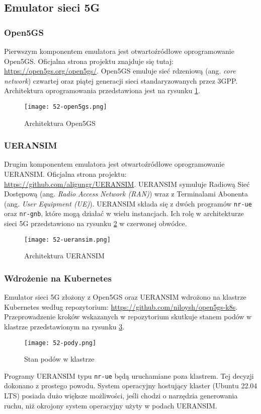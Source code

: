 \subsection{Emulator sieci 5G}

\subsubsection{Open5GS}

Pierwszym komponentem emulatora jest otwartoźródłowe oprogramowanie Open5GS. Oficjalna strona projektu znajduje się tutaj: \url{https://open5gs.org/open5gs/}. Open5GS emuluje sieć rdzeniową (ang. \textit{core network}) czwartej oraz piątej generacji sieci standaryzowanych przez 3GPP. Architektura oprogramowania przedstawiona jest na rysunku \ref{fig:52-open5gs}.

\begin{figure}[!h]
    \centering \texttt{[image: 52-open5gs.png]}
    \caption{Architektura Open5GS}\label{fig:52-open5gs}
\end{figure}

\subsubsection{UERANSIM}

Drugim komponentem emulatora jest otwartoźródłowe oprogramowanie UERANSIM. Oficjalna strona projektu: \url{https://github.com/aligungr/UERANSIM}. UERANSIM symuluje Radiową Sieć Dostępową (ang. \textit{Radio Access Network (RAN)}) wraz z Terminalami Abonenta (ang. \textit{User Equipment (UE)}). UERANSIM składa się z dwóch programów \texttt{nr-ue} oraz \texttt{nr-gnb}, które mogą działać w wielu instancjach. Ich rolę w architekturze sieci 5G przedstawiono na rysunku \ref{fig:52-ueransim} w czerwonej obwódce.

\begin{figure}[!h]
    \centering \texttt{[image: 52-ueransim.png]}
    \caption{Architektura UERANSIM}\label{fig:52-ueransim}
\end{figure}

\subsubsection{Wdrożenie na Kubernetes}

Emulator sieci 5G złożony z Open5GS oraz UERANSIM wdrożono na klastrze Kubernetes według repozytorium: \url{https://github.com/niloysh/open5gs-k8s}. Przeprowadzenie kroków wskazanych w repozytorium skutkuje stanem podów w klastrze przedstawionym na rysunku \ref{fig:52-pody}.

\begin{figure}[!h]
    \centering \texttt{[image: 52-pody.png]}
    \caption{Stan podów w klastrze}\label{fig:52-pody}
\end{figure}

Programy UERANSIM typu \texttt{nr-ue} będą uruchamiane poza klastrem. Tej decyzji dokonano z prostego powodu. System operacyjny hostujący klaster (Ubuntu 22.04 LTS) posiada dużo większe możliwości, jeśli chodzi o narzędzia generowania ruchu, niż okrojony system operacyjny użyty w podach UERANSIM.